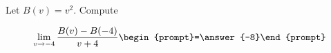 \documentclass{ximera}
\author{Bart Snapp}
\begin{document}
\begin{exercise}
Let $B(v) = v^2$. Compute

\[
\lim_{ v\to -4 } 
\frac{B(v)-B(-4)}{v+4} \begin{prompt}=\answer{-8}\end{prompt}
\]
\end{exercise}
\end{document}
